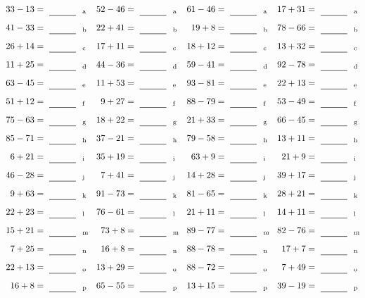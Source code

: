 \documentclass
[
  draft    = true,
  fontsize = 11pt,
  parskip  = half-
]
{scrartcl}
\begin{document}
\clearpage
\begin{align*}
    \pline{33-13}&=\rline{a}
  & \pline{52-46}&=\rline{a}
  & \pline{61-46}&=\rline{a}
  & \pline{17+31}&=\rline{a} \\[1ex]
    \pline{41-33}&=\rline{b}
  & \pline{22+41}&=\rline{b}
  & \pline{19+8}&=\rline{b}
  & \pline{78-66}&=\rline{b} \\[1ex]
    \pline{26+14}&=\rline{c}
  & \pline{17+11}&=\rline{c}
  & \pline{18+12}&=\rline{c}
  & \pline{13+32}&=\rline{c} \\[1ex]
    \pline{11+25}&=\rline{d}
  & \pline{44-36}&=\rline{d}
  & \pline{59-41}&=\rline{d}
  & \pline{92-78}&=\rline{d} \\[1ex]
    \pline{63-45}&=\rline{e}
  & \pline{11+53}&=\rline{e}
  & \pline{93-81}&=\rline{e}
  & \pline{22+13}&=\rline{e} \\[1ex]
    \pline{51+12}&=\rline{f}
  & \pline{9+27}&=\rline{f}
  & \pline{88-79}&=\rline{f}
  & \pline{53-49}&=\rline{f} \\[1ex]
    \pline{75-63}&=\rline{g}
  & \pline{18+22}&=\rline{g}
  & \pline{21+33}&=\rline{g}
  & \pline{66-45}&=\rline{g} \\[1ex]
    \pline{85-71}&=\rline{h}
  & \pline{37-21}&=\rline{h}
  & \pline{79-58}&=\rline{h}
  & \pline{13+11}&=\rline{h} \\[1ex]
    \pline{6+21}&=\rline{i}
  & \pline{35+19}&=\rline{i}
  & \pline{63+9}&=\rline{i}
  & \pline{21+9}&=\rline{i} \\[1ex]
    \pline{46-28}&=\rline{j}
  & \pline{7+41}&=\rline{j}
  & \pline{14+28}&=\rline{j}
  & \pline{39+17}&=\rline{j} \\[1ex]
    \pline{9+63}&=\rline{k}
  & \pline{91-73}&=\rline{k}
  & \pline{81-65}&=\rline{k}
  & \pline{28+21}&=\rline{k} \\[1ex]
    \pline{22+23}&=\rline{l}
  & \pline{76-61}&=\rline{l}
  & \pline{21+11}&=\rline{l}
  & \pline{14+11}&=\rline{l} \\[1ex]
    \pline{15+21}&=\rline{m}
  & \pline{73+8}&=\rline{m}
  & \pline{89-77}&=\rline{m}
  & \pline{82-76}&=\rline{m} \\[1ex]
    \pline{7+25}&=\rline{n}
  & \pline{16+8}&=\rline{n}
  & \pline{88-78}&=\rline{n}
  & \pline{17+7}&=\rline{n} \\[1ex]
    \pline{22+13}&=\rline{o}
  & \pline{13+29}&=\rline{o}
  & \pline{88-72}&=\rline{o}
  & \pline{7+49}&=\rline{o} \\[1ex]
    \pline{16+8}&=\rline{p}
  & \pline{65-55}&=\rline{p}
  & \pline{13+15}&=\rline{p}
  & \pline{39-19}&=\rline{p}
\end{align*}
\end{document}

